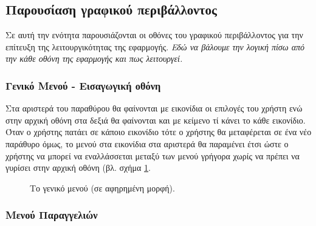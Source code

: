 \documentclass{assignment}
\begin{document}
\subsection{Παρουσίαση γραφικού περιβάλλοντος}

Σε αυτή την ενότητα παρουσιάζονται οι οθόνες του γραφικού περιβάλλοντος για την επίτευξη της λειτουργικότητας της εφαρμογής.
\emph{Εδώ να βάλουμε την λογική πίσω από την κάθε οθόνη της εφαρμογής και πως λειτουργεί.}\\

\subsubsection{Γενικό Μενού - Εισαγωγική οθόνη}

Στα αριστερά του παραθύρου θα φαίνονται με εικονίδια οι επιλογές του χρήστη ενώ στην αρχική οθόνη στα δεξιά θα φαίνονται και με κείμενο τί κάνει το κάθε εικονίδιο. Όταν ο χρήστης πατάει σε κάποιο εικονίδιο τότε ο χρήστης θα μεταφέρεται σε ένα νέο παράθυρο όμως, το μενού στα εικονίδια στα αριστερά θα παραμένει έτσι ώστε ο χρήστης να μπορεί να εναλλάσσεται μεταξύ των μενού γρήγορα χωρίς να πρέπει να γυρίσει στην αρχική οθόνη (βλ. σχήμα \ref{fig:menu:general}.

\begin{figure}
\begin{center}
\caption{Το γενικό μενού (σε αφηρημένη μορφή).}
\label{fig:menu:general}
\end{center}
\end{figure}

\subsubsection{Μενού Παραγγελιών}
\end{document}

